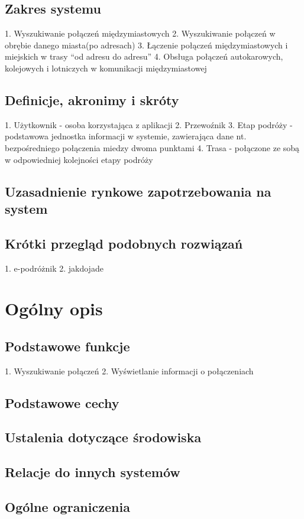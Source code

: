 \documentclass[12pt,a4paper]{report}
\begin{document}
\subsection{Zakres systemu}
	1. Wyszukiwanie połączeń międzymiastowych
	2. Wyszukiwanie połączeń w obrębie danego miasta(po adresach)
	3. Łączenie połączeń międzymiastowych i miejskich w trasy “od adresu do adresu”
	4. Obsługa połączeń autokarowych, kolejowych i lotniczych w komunikacji międzymiastowej
\subsection{Definicje, akronimy i skróty}
	1. Użytkownik - osoba korzystająca z aplikacji
	2. Przewoźnik 
	3. Etap podróży - podstawowa jednostka informacji w systemie, zawierająca dane nt. bezpośredniego połączenia miedzy dwoma punktami  
	4. Trasa - połączone ze sobą w odpowiedniej kolejności etapy podróży
\subsection{Uzasadnienie rynkowe zapotrzebowania na system}
	
\subsection{Krótki przegląd podobnych rozwiązań}
	1. e-podróżnik
	2. jakdojade
\section{Ogólny opis}
\subsection{Podstawowe funkcje}
	1. Wyszukiwanie połączeń
	2. Wyświetlanie informacji o połączeniach
\subsection{Podstawowe cechy}
\subsection{Ustalenia dotyczące środowiska}
\subsection{Relacje do innych systemów}
\subsection{Ogólne ograniczenia}
\end{document}
